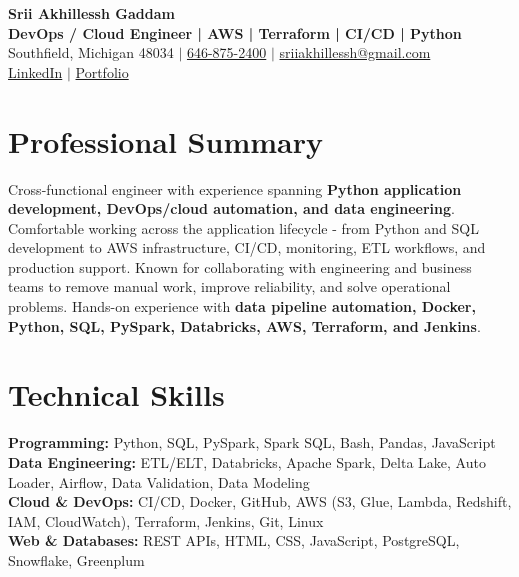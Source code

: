 \documentclass[letterpaper,10pt]{article}
\begin{document}
\fontsize{9.35pt}{10.45pt}\selectfont

\begin{center}
    {\LARGE \textbf{Srii Akhillessh Gaddam}} \\[-1pt]
    \textbf{DevOps / Cloud Engineer | AWS | Terraform | CI/CD | Python} \\[2pt]
    Southfield, Michigan 48034 $|$
    \href{tel:6468752400}{646-875-2400} $|$
    \href{mailto:sriiakhillessh@gmail.com}{sriiakhillessh@gmail.com} \\[1pt]
    \href{https://www.linkedin.com/in/srii-akhiilessh-gaddam-b48668191/}{LinkedIn} $|$
    \href{https://sriiakhillesshg.github.io/portfolio/}{Portfolio}
\end{center}
\vspace{-8pt}

\section{Professional Summary}
\small{Cross-functional engineer with experience spanning \textbf{Python application development, DevOps/cloud automation, and data engineering}. Comfortable working across the application lifecycle - from Python and SQL development to AWS infrastructure, CI/CD, monitoring, ETL workflows, and production support. Known for collaborating with engineering and business teams to remove manual work, improve reliability, and solve operational problems. Hands-on experience with \textbf{data pipeline automation, Docker, Python, SQL, PySpark, Databricks, AWS, Terraform, and Jenkins}.}

\section{Technical Skills}
\small{
\textbf{Programming:} Python, SQL, PySpark, Spark SQL, Bash, Pandas, JavaScript \\
\textbf{Data Engineering:} ETL/ELT, Databricks, Apache Spark, Delta Lake, Auto Loader, Airflow, Data Validation, Data Modeling \\
\textbf{Cloud \& DevOps:} CI/CD, Docker, GitHub, AWS (S3, Glue, Lambda, Redshift, IAM, CloudWatch), Terraform, Jenkins, Git, Linux \\
\textbf{Web \& Databases:} REST APIs, HTML, CSS, JavaScript, PostgreSQL, Snowflake, Greenplum
}
\end{document}
